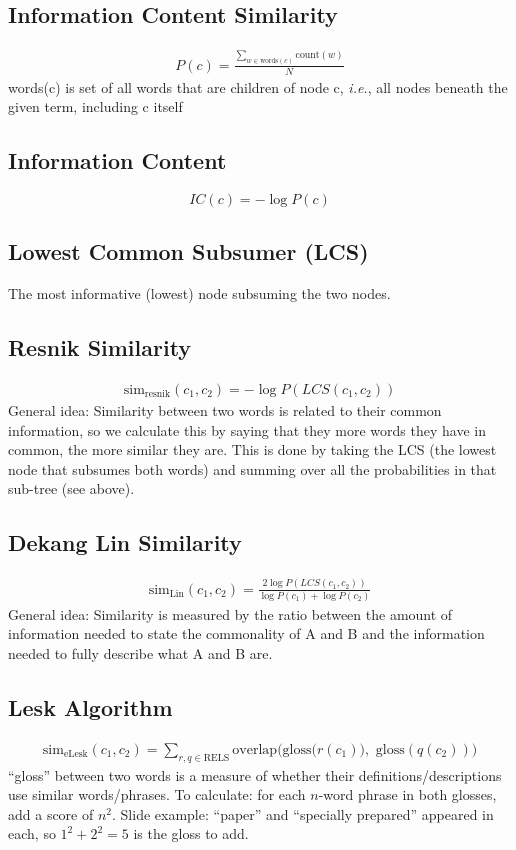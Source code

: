 \documentclass[10pt,twocolumn]{amsart}
\begin{document}
\subsection{Information Content Similarity}
\begin{gather*}
P(c) = \frac{\sum_{w \in \text{words}(c)} \text{count}(w)}{N}
\end{gather*}
words(c) is set of all words that are children of node c, \emph{i.e.}, all 
nodes beneath the given term, including c itself
\subsection{Information Content}
\[IC(c) = -\log P(c) \]
\subsection{Lowest Common Subsumer (LCS)}
The most informative (lowest) node subsuming the two nodes.
\subsection{Resnik Similarity}
\begin{gather*}
\text{sim}_{\text{resnik}}(c_{1},c_{2}) = -\log P(LCS(c_{1},c_{2}))
\end{gather*}
General idea: Similarity between two words is related to their common information,
so we calculate this by saying that they more words they have in common, the
more similar they are. This is done by taking the LCS (the lowest node that
subsumes both words) and summing over all the probabilities in that sub-tree (see
above).
\subsection{Dekang Lin Similarity}
\begin{gather*}
\text{sim}_{\text{Lin}}(c_{1},c_{2}) = \frac
{2\log P(LCS(c_1,c_2))}
{\log P(c_{1})+\log P(c_{2})}
\end{gather*}
General idea: Similarity is measured by the ratio between the amount of information
needed to state the commonality of A and B and the information needed to fully
describe what A and B are.
\subsection{Lesk Algorithm}
\begin{gather*}
\text{sim}_{\text{eLesk}}(c_1,c_2) = \sum_{r,q\in \text{RELS}} 
\text{overlap(gloss(} r(c_1)),\text{ gloss}(q(c_2)))
\end{gather*}
``gloss'' between two words is a measure of whether their definitions/descriptions
use similar words/phrases. To calculate: for each $n$-word phrase in both glosses,
add a score of $n^2$. Slide example: ``paper'' and ``specially prepared'' appeared
in each, so $1^2 + 2^2 = 5$ is the gloss to add.
\end{document}
